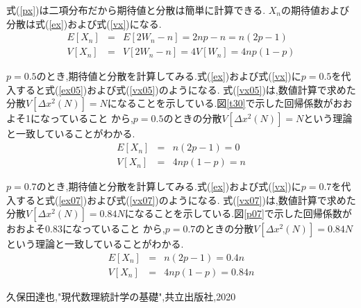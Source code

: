\documentclass[a4j]{jarticle}
\begin{document}
          式(\ref{px})は二項分布だから期待値と分散は簡単に計算できる. $X_n$の期待値および分散は式(\ref{ex})および式(\ref{vx})になる.
          \begin{eqnarray}
            E[X_n] &=& E[2W_n -n] = 2np-n = n(2p-1) \label{ex} \\
            V[X_n] &=& V[2W_n -n] = 4V[W_n] = 4np(1-p) \label{vx}
          \end{eqnarray}

          $p=0.5$のとき,期待値と分散を計算してみる.式(\ref{ex})および式(\ref{vx})に$p=0.5$を代入すると式(\ref{ex05})および式(\ref{vx05})のようになる.
          式(\ref{vx05})は,数値計算で求めた分散$V[\Delta x^2(N)]=N$になることを示している.図\ref{t30}で示した回帰係数がおおよそ1になっていること
          から,$p=0.5$のときの分散$V[\Delta x^2(N)]=N$という理論と一致していることがわかる.
          \begin{eqnarray}
            E[X_n] &=&  n(2p-1) = 0 \label{ex05} \\
            V[X_n] &=& 4np(1-p) = n \label{vx05}
          \end{eqnarray}
        
          $p=0.7$のとき,期待値と分散を計算してみる.式(\ref{ex})および式(\ref{vx})に$p=0.7$を代入すると式(\ref{ex07})および式(\ref{vx07})のようになる.
          式(\ref{vx07})は,数値計算で求めた分散$V[\Delta x^2(N)]=0.84N$になることを示している.図\ref{p07}で示した回帰係数がおおよそ0.83になっていること
          から,$p=0.7$のときの分散$V[\Delta x^2(N)]=0.84N$という理論と一致していることがわかる.
          \begin{eqnarray}
            E[X_n] &=&  n(2p-1) = 0.4n \label{ex07} \\
            V[X_n] &=& 4np(1-p) = 0.84n \label{vx07}
          \end{eqnarray}
         
        \begin{thebibliography}{9}
              久保田達也,"現代数理統計学の基礎",共立出版社,2020
          \end{thebibliography}
\end{document}
